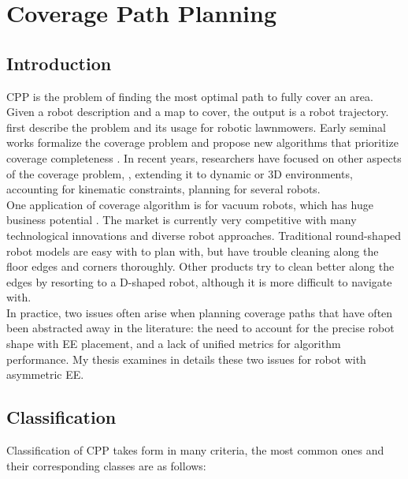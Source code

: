\section{Coverage Path Planning}

\subsection{Introduction}

\ac{CPP} is the problem of finding the most optimal path to fully cover an area. Given a robot description and a map to cover, the output is a robot trajectory.  first describe the problem and its usage for robotic lawnmowers. Early seminal works formalize the coverage problem and propose new algorithms that prioritize coverage completeness \cite{latombe1991, zelinsky1993icar, choset2000ar}. In recent years, researchers have focused on other aspects of the coverage problem, \eg, extending it to dynamic or 3D environments, accounting for kinematic constraints, planning for several robots.\\

One application of coverage algorithm is for vacuum robots, which has huge business potential \cite{schofield1995, ifr}. The market is currently very competitive with many technological innovations and diverse robot approaches. Traditional round-shaped robot models are easy with to plan with, but have trouble cleaning along the floor edges and corners thoroughly. Other products try to clean better along the edges by resorting to a D-shaped robot, although it is more difficult to navigate with.\\

In practice, two issues often arise when planning coverage paths that have often been abstracted away in the literature: the need to account for the precise robot shape with \ac{EE} placement, and a lack of unified metrics for algorithm performance. My thesis examines in details these two issues for robot with asymmetric \ac{EE}.\\

\subsection{Classification}

Classification of \ac{CPP} takes form in many criteria, the most common ones and their corresponding classes are as follows:

